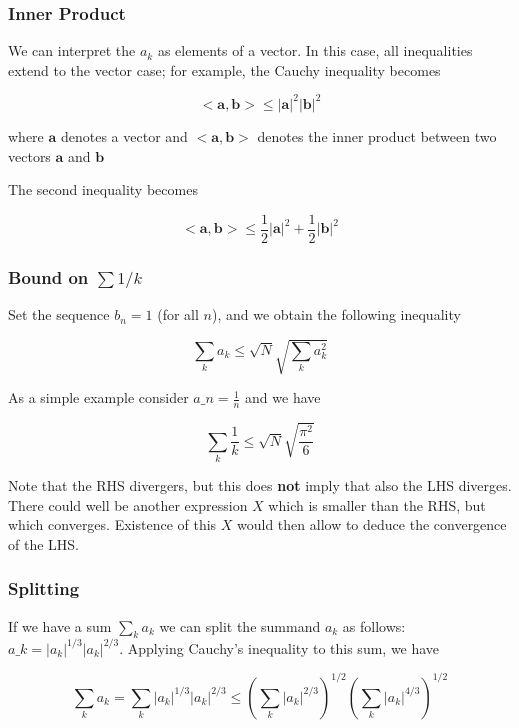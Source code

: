 
\subsubsection{Inner Product}

We can interpret the \(a_k\) as elements of a vector. In this case, all inequalities extend to the vector case; for example, the Cauchy
inequality becomes

\[
<\mathbf{a},\mathbf{b}> \leq |\mathbf{a}|^2 |\mathbf{b}|^2
\]

where \(\mathbf{a}\) denotes a vector and \(<\mathbf{a},\mathbf{b}>\)
denotes the inner product between two vectors \(\mathbf{a}\) and
\(\mathbf{b}\)

The second inequality becomes

\[
<\mathbf{a},\mathbf{b}> \leq \frac{1}{2} |\mathbf{a}|^2 + \frac{1}{2} |\mathbf{b}|^2
\]

\subsubsection{Bound on \(\sum 1/k\)}

Set the sequence $b_n=1$ (for all $n$), and we obtain the following inequality

\[ \sum_k a_k \leq \sqrt{N} \sqrt{\sum_k a_k^2} \]

As a simple example consider $a\_n = \frac{1}{n}$ and we have

\[ \sum_k \frac{1}{k} \leq \sqrt{N} \sqrt{\frac{\pi^2}{6}} \]

Note that the RHS divergers, but this does \textbf{not} imply that also the LHS diverges. There could well be another expression
$X$ which is smaller than the RHS, but which converges. Existence of this $X$ would then allow to deduce the convergence of the LHS.

\subsubsection{Splitting}

If we have a sum $\sum_k a_k $ we can split the summand $a_k$ as follows: $a\_k = |a_k|^{1/3} |a_k|^{2/3}$. Applying Cauchy's
inequality to this sum, we have

\[
\sum_k a_k = \sum_k |a_k|^{1/3} |a_k|^{2/3} \leq \left( \sum_k |a_k|^{2/3} \right)^{1/2} \left( \sum_k |a_k|^{4/3} \right)^{1/2}
\]
